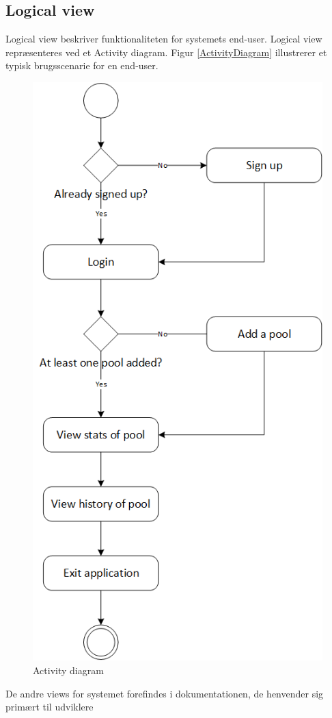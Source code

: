 \subsection{Logical view}
Logical view beskriver funktionaliteten for systemets end-user. Logical view repræsenteres ved et Activity diagram. Figur \ref{ActivityDiagram} illustrerer et typisk brugsscenarie for en end-user. 
\begin{figure}
\centering
\includegraphics[width=0.55\linewidth]{figs/arkitektur/ActivityDiagram.PNG}
\caption{Activity diagram}
\label{fig:ActivityDiagram}
\end{figure}

De andre views for systemet forefindes i dokumentationen, de henvender sig primært til udviklere


